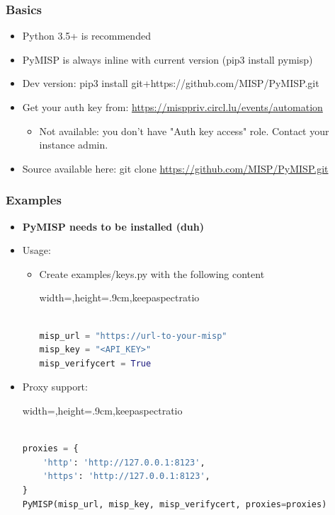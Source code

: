 \begin{frame}
    \frametitle{Basics}
    \begin{itemize}
        \item Python 3.5+ is recommended
        \item PyMISP is always inline with current version (pip3 install pymisp)
        \item Dev version: pip3 install git+https://github.com/MISP/PyMISP.git
        \item Get your auth key from: \url{https://misppriv.circl.lu/events/automation}
        \begin{itemize}
            \item Not available: you don't have "Auth key access" role. Contact your instance admin.
        \end{itemize}
        \item Source available here: git clone \url{https://github.com/MISP/PyMISP.git}
    \end{itemize}
\end{frame}

\begin{frame}[fragile]
    \frametitle{Examples}
    \begin{itemize}
        \item {\bf PyMISP needs to be installed (duh)}
        \item Usage:
        \begin{itemize}
            \item Create examples/keys.py with the following content
            \begin{adjustbox}{width=\textwidth,height=.9cm,keepaspectratio}
                \begin{lstlisting}[language=python,firstnumber=1]

misp_url = "https://url-to-your-misp"
misp_key = "<API_KEY>"
misp_verifycert = True

                \end{lstlisting}
            \end{adjustbox}
        \end{itemize}
        \item Proxy support:
        \begin{adjustbox}{width=\textwidth,height=.9cm,keepaspectratio}
            \begin{lstlisting}[language=python,firstnumber=1]

proxies = {
    'http': 'http://127.0.0.1:8123',
    'https': 'http://127.0.0.1:8123',
}
PyMISP(misp_url, misp_key, misp_verifycert, proxies=proxies)
            \end{lstlisting}
        \end{adjustbox}
    \end{itemize}
\end{frame}

